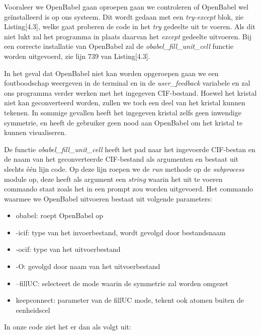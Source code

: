 

Vooraleer we OpenBabel gaan oproepen gaan we controleren of OpenBabel wel geïnstalleerd is op ons systeem. Dit wordt gedaan met een \textit{try-except} blok, zie Listing[4.3], welke gaat proberen de code in het \textit{try} gedeelte uit te voeren. Als dit niet lukt zal het programma in plaats daarvan het \textit{except} gedeelte uitvoeren. Bij een correcte installatie van OpenBabel zal de \textit{obabel\_fill\_unit\_cell} functie worden uitgevoerd, zie lijn 739 van Listing[4.3].
\par
In het geval dat OpenBabel niet kan worden opgeroepen gaan we een foutboodschap weergeven in de terminal en in de \textit{user\_feedback} variabele en zal ons programma verder werken met het ingegeven CIF-bestand. Hoewel het kristal niet kan geconverteerd worden, zullen we toch een deel van het kristal kunnen tekenen. In sommige gevallen heeft het ingegeven kristal zelfs geen inwendige symmetrie, en heeft de gebruiker geen nood aan OpenBabel om het kristal te kunnen visualiseren.


\par	
De functie \textit{obabel\_fill\_unit\_cell} heeft het pad naar het ingevoerde CIF-bestan en de naam van het geconverteerde CIF-bestand als argumenten en bestaat uit slechts één lijn code. Op deze lijn roepen we de \textit{run} methode op de \textit{subprocess} module op, deze heeft als argument een \textit{string} waarin het uit te voeren commando staat zoals het in een prompt zou worden uitgevoerd. Het commando waarmee we OpenBabel uitvoeren bestaat uit volgende parameters:
\begin{itemize}
\item obabel: roept OpenBabel op
\item -icif: type van het invoerbestand, wordt gevolgd door bestandsnaam
\item -ocif: type van het uitvoerbestand
\item -O: gevolgd door naam van het uitvoerbestand
\item --fillUC: selecteert de mode waarin de symmetrie zal worden omgezet
\item keepconnect: parameter van de fillUC mode, tekent ook atomen buiten de eenheidscel
\end{itemize}
In onze code ziet het er dan als volgt uit:


